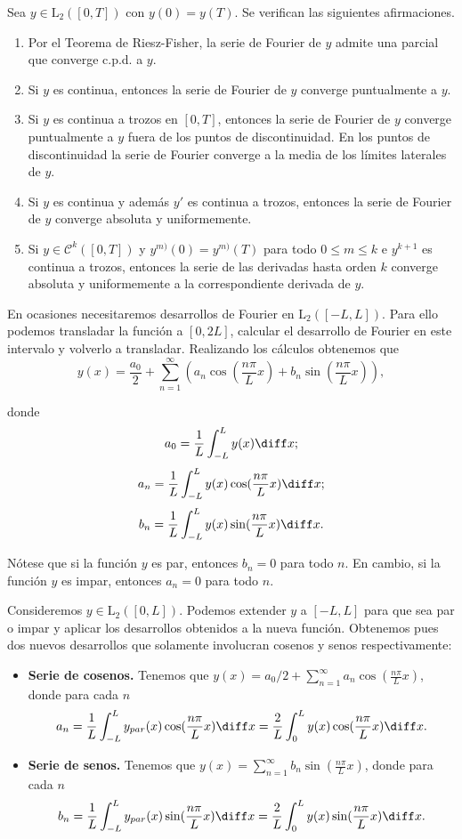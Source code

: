 \documentclass{article}
\begin{document}
\begin{theorem}
  \label{thm:fourier:convergencia}
  Sea $y \in \mathrm{L}_2([0,T])$ con $y(0) = y(T)$. Se verifican las siguientes afirmaciones.
  \begin{enumerate}
  \item Por el Teorema de Riesz-Fisher, la serie de Fourier de $y$ admite una parcial que converge
    c.p.d. a $y$.
  \item Si $y$ es continua, entonces la serie de Fourier de $y$ converge puntualmente a $y$.
  \item Si $y$ es continua a trozos en $[0,T]$, entonces la serie de Fourier de $y$ converge
    puntualmente a $y$ fuera de los puntos de discontinuidad. En los puntos de discontinuidad la
    serie de Fourier converge a la media de los límites laterales de $y$.
  \item Si $y$ es continua y además $y'$ es continua a trozos, entonces la serie de Fourier de $y$
    converge absoluta y uniformemente.
  \item Si $y \in \mathcal{C}^{k}([0,T])$ y $y^{m)}(0) = y^{m)}(T)$ para todo $0 \le m \le k$ e
    $y^{k+1}$ es continua a trozos, entonces la serie de las derivadas hasta orden $k$ converge
    absoluta y uniformemente a la correspondiente derivada de $y$.
  \end{enumerate}
\end{theorem}

En ocasiones necesitaremos desarrollos de Fourier en $\mathrm{L}_2([-L,L])$. Para ello podemos
transladar la función a $[0,2L]$, calcular el desarrollo de Fourier en este intervalo y volverlo a
transladar. Realizando los cálculos obtenemos que
\[ y(x) = \frac{a_0}{2} + \sum\limits_{n = 1}^{\infty} \left(a_n \cos(\frac{n \pi}{L} x) + b_n
    \sin(\frac{n \pi}{L} x)\right), \]

donde
\[ a_0 = \frac{1}{L} \int_{-L}^L y(x) \diff x; \]
\[ a_n = \frac{1}{L} \int_{-L}^L y(x) \cos(\frac{n \pi}{L}x) \diff x; \]
\[ b_n = \frac{1}{L} \int_{-L}^L y(x) \sin(\frac{n \pi}{L}x) \diff x. \]

Nótese que si la función $y$ es par, entonces $b_n = 0$ para todo $n$. En cambio, si la función $y$
es impar, entonces $a_n = 0$ para todo $n$.

Consideremos $y \in \mathrm{L}_2([0,L])$. Podemos extender $y$ a $[-L, L]$ para que sea par o impar
y aplicar los desarrollos obtenidos a la nueva función. Obtenemos pues dos nuevos desarrollos que
solamente involucran cosenos y senos respectivamente:
\begin{itemize}
\item \textbf{Serie de cosenos.} Tenemos que
  $y(x) = a_0 / 2 + \sum_{n = 1}^{\infty} a_n \cos(\frac{n \pi}{L} x)$, donde para cada $n$
  \[ a_n = \frac{1}{L} \int_{-L}^L y_{par}(x) \cos(\frac{n \pi}{L}x) \diff x = \frac{2}{L}
    \int_{0}^L y(x) \cos(\frac{n \pi}{L}x) \diff x.\]
\item \textbf{Serie de senos.} Tenemos que
  $y(x) = \sum_{n = 1}^{\infty} b_n \sin(\frac{n \pi}{L} x)$, donde para cada $n$
  \[ b_n = \frac{1}{L} \int_{-L}^L y_{par}(x) \sin(\frac{n \pi}{L}x) \diff x = \frac{2}{L}
    \int_{0}^L y(x) \sin(\frac{n \pi}{L}x) \diff x.\]
\end{itemize}
\end{document}
